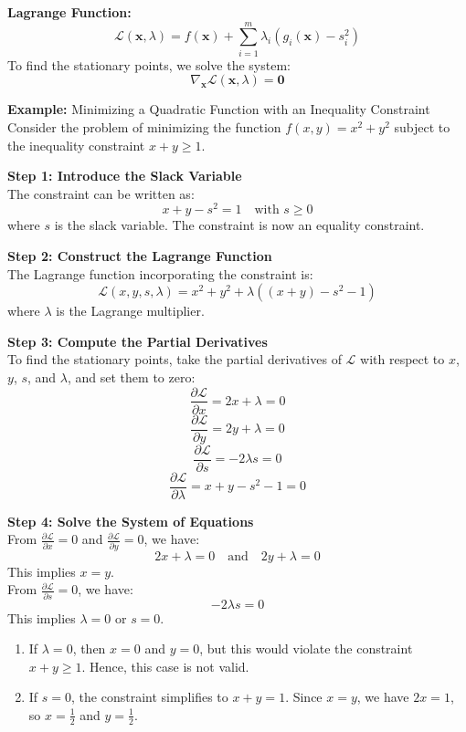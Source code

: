 \documentclass[]{article}
\begin{document}
	\textbf{Lagrange Function:}
	$$
	\mathcal{L}(\mathbf{x}, \lambda)
	= f(\mathbf{x}) + \sum_{i=1}^m \lambda_i \left( g_i(\mathbf{x}) - s_i^2 \right)
	$$
	To find the stationary points, we solve the system:
	$$
	\nabla_\mathbf{x} \mathcal{L}(\mathbf{x}, \lambda) = \mathbf{0}
	$$
	
	\textbf{Example:}
	Minimizing a Quadratic Function with an Inequality Constraint\\
	Consider the problem of minimizing the function $f(x, y) = x^2 + y^2$ subject to the inequality constraint $x + y \geq 1$.
	
	\textbf{Step 1: Introduce the Slack Variable}\\
	The constraint can be written as:
	$$
	x + y - s^2 = 1 \quad \text{with } s \geq 0
	$$
	where $s$ is the slack variable.
	The constraint is now an equality constraint.
	
	\textbf{Step 2: Construct the Lagrange Function}\\
	The Lagrange function incorporating the constraint is:
	$$
	\mathcal{L}(x, y, s, \lambda) = x^2 + y^2 + \lambda \left( (x + y) - s^2 - 1 \right)
	$$
	where $\lambda$ is the Lagrange multiplier.
	
	\textbf{Step 3: Compute the Partial Derivatives}\\
	To find the stationary points, take the partial derivatives of $\mathcal{L}$ with respect to $x$, $y$, $s$, and $\lambda$, and set them to zero:
	$$
	\frac{\partial \mathcal{L}}{\partial x} = 2x + \lambda = 0
	$$
	$$
	\frac{\partial \mathcal{L}}{\partial y} = 2y + \lambda = 0
	$$
	$$
	\frac{\partial \mathcal{L}}{\partial s} = -2\lambda s = 0
	$$
	$$
	\frac{\partial \mathcal{L}}{\partial \lambda} = x + y - s^2 - 1 = 0
	$$
	
	\textbf{Step 4: Solve the System of Equations}\\
	From $\frac{\partial \mathcal{L}}{\partial x} = 0$ and $\frac{\partial \mathcal{L}}{\partial y} = 0$, we have:
	$$
	2x + \lambda = 0 \quad \text{and} \quad 2y + \lambda = 0
	$$
	This implies $x = y$.\\
	From $\frac{\partial \mathcal{L}}{\partial s} = 0$, we have:
	$$
	-2\lambda s = 0
	$$
	This implies $\lambda = 0$ or $s = 0$. 
	
	\begin{enumerate}
		\item If $\lambda = 0$, then $x = 0$ and $y = 0$, but this would violate the constraint $x + y \geq 1$.
		Hence, this case is not valid.
		\item If $s = 0$, the constraint simplifies to $x + y = 1$.
		Since $x = y$, we have $2x = 1$, so $x = \frac{1}{2}$ and $y = \frac{1}{2}$.
	\end{enumerate}
	
\end{document}
